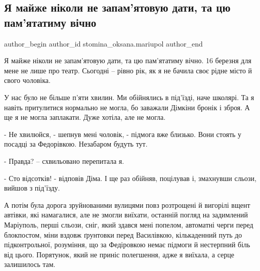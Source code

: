  
 
 
 
 

\subsection{Я майже ніколи не запам’ятовую дати, та цю пам’ятатиму вічно}
\label{sec:17_03_2023.fb.stomina_oksana.mariupol.1.daty_pamjatatymu_vichno}

\ifcmt
 author_begin
   author_id stomina_oksana.mariupol
 author_end
\fi

Я майже ніколи не запам'ятовую дати, та цю пам'ятатиму вічно. 16 березня для
мене не лише про театр. Сьогодні – рівно рік, як я не бачила своє рідне місто й
свого чоловіка. 

У нас було не більше п'яти хвилин. Ми обійнялись в під'їзді, наче школярі. Та я
навіть притулитися нормально не могла, бо заважали Дімкіни бронік і зброя. А ще
я не могла заплакати. Дуже хотіла, але не могла. 

- Не хвилюйся, - шепнув мені чоловік, - підмога вже близько. Вони стоять у
посадці за Федорівкою. Незабаром будуть тут.

- Правда? – схвильовано перепитала я.

- Сто відсотків! - відповів Діма. І ще раз обійняв, поцілував  і, змахнувши
сльози, вийшов з під'їзду. 


А потім була дорога зруйнованими вулицями повз розтрощені й вигорілі вщент
автівки, які намагалися, але не змогли виїхати, останній погляд на задимлений
Маріуполь, перші сльози, сніг, який здався мені попелом, автоматні черги перед
блокпостом, міни вздовж ґрунтовки перед Василівкою, кількаденний путь до
підконтрольної, розуміння, що за Федіровкою немає підмоги й нестерпний біль від
цього.  Порятунок, який не приніс полегшення, адже я виїхала, а серце
залишилось там.

